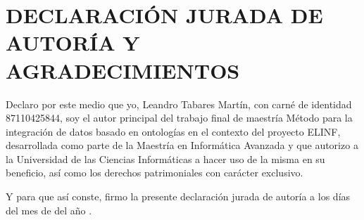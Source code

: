 \chapter*{\large DECLARACIÓN JURADA DE AUTORÍA Y AGRADECIMIENTOS}

\lhead{}
\chead{}
\lfoot{}
\cfoot{}
\rfoot{\thepage}
\renewcommand{\headrulewidth}{0.4pt}

Declaro por este medio que yo, Leandro Tabares Martín, con carné de identidad 87110425844, soy el autor principal del trabajo final de maestría Método para la integración de datos basado en ontologías en el contexto del proyecto ELINF, desarrollada como parte de la Maestría en Informática Avanzada y que autorizo a la Universidad de las Ciencias Informáticas a hacer uso de la misma en su beneficio, así como los derechos patrimoniales con carácter exclusivo.

\espacios

Y para que así conste, firmo la presente declaración jurada de autoría a los \fillDia días del mes de \fillMes del año \fillAnno.

\espacios
\espacios

\firmaTesis
